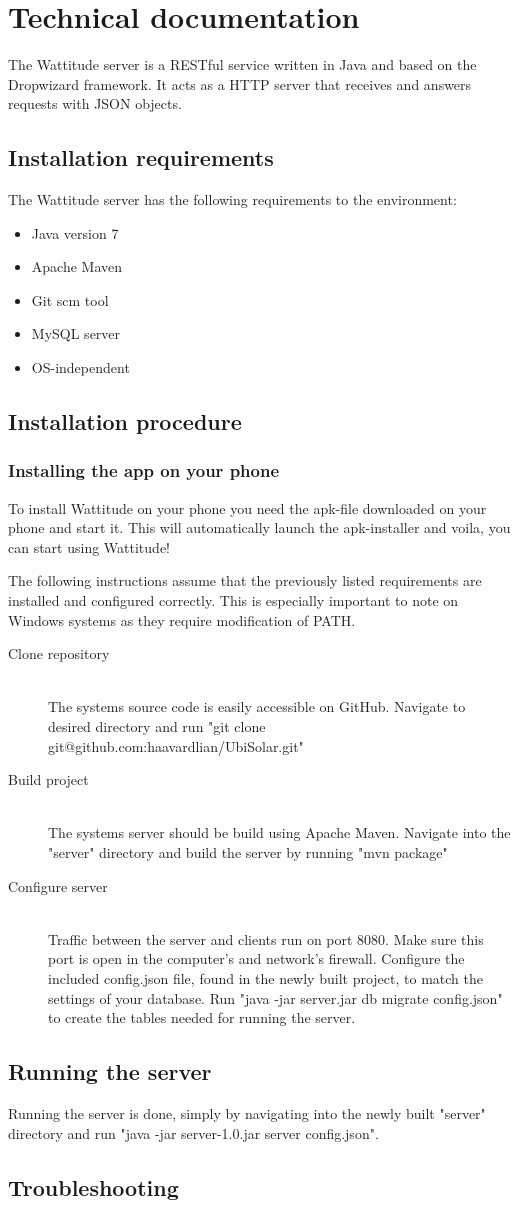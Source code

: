 \chapter{Technical documentation}
The Wattitude server is a RESTful service written in Java and based on the Dropwizard framework. It acts as a HTTP server that receives and answers requests with JSON objects. 
\section{Installation requirements}
The Wattitude server has the following requirements to the environment:
\begin{itemize}
\item Java version 7
\item Apache Maven 
\item Git scm tool
\item MySQL server
\item OS-independent
\end{itemize}
\section{Installation procedure}

\subsection{Installing the app on your phone}
\label{sec:installWattitudePhone}
To install Wattitude on your phone you need the apk-file downloaded on your phone and start it. This will automatically launch the apk-installer and voila, you can start using Wattitude!

The following instructions assume that the previously listed requirements are installed and configured correctly. This is especially important to note on Windows systems as they require modification of PATH.
\begin{description}
  \item[Clone repository] \hfill \\
  The systems source code is easily accessible on GitHub. Navigate to desired directory and run "git clone git@github.com:haavardlian/UbiSolar.git"
  \item[Build project] \hfill \\
  The systems server should be build using Apache Maven. Navigate into the "server" directory and build the server by running "mvn package"
  \item[Configure server] \hfill \\
  Traffic between the server and clients run on port 8080. Make sure this port is open in the computer's and network's firewall. Configure the included config.json file, found in the newly built project, to match the settings of your database. Run "java -jar server.jar db migrate config.json" to create the tables needed for running the server. 
  
\end{description}

\section{Running the server}
Running the server is done, simply by navigating into the newly built "server" directory and run "java -jar server-1.0.jar server config.json".

\section{Troubleshooting}